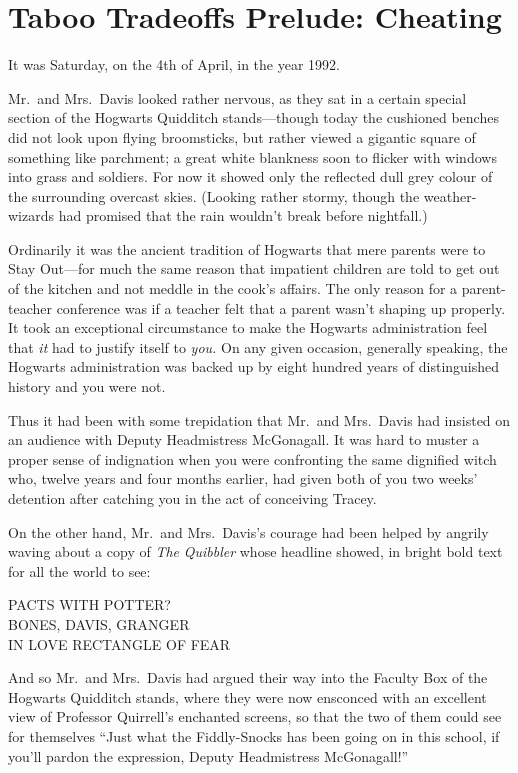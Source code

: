 \chapter{Taboo Tradeoffs Prelude:
Cheating}\label{taboo-tradeoffs-prelude-cheating}

It was Saturday, on the 4th of April, in the year 1992.

Mr.~and Mrs.~Davis looked rather nervous, as they sat in a certain
special section of the Hogwarts Quidditch stands---though today the
cushioned benches did not look upon flying broomsticks, but rather
viewed a gigantic square of something like parchment; a great white
blankness soon to flicker with windows into grass and soldiers. For now
it showed only the reflected dull grey colour of the surrounding
overcast skies. (Looking rather stormy, though the weather-wizards had
promised that the rain wouldn't break before nightfall.)

Ordinarily it was the ancient tradition of Hogwarts that mere parents
were to Stay Out---for much the same reason that impatient children are
told to get out of the kitchen and not meddle in the cook's affairs. The
only reason for a parent-teacher conference was if a teacher felt that a
parent wasn't shaping up properly. It took an exceptional circumstance
to make the Hogwarts administration feel that \emph{it} had to justify
itself to \emph{you.} On any given occasion, generally speaking, the
Hogwarts administration was backed up by eight hundred years of
distinguished history and you were not.

Thus it had been with some trepidation that Mr.~and Mrs.~Davis had
insisted on an audience with Deputy Headmistress McGonagall. It was hard
to muster a proper sense of indignation when you were confronting the
same dignified witch who, twelve years and four months earlier, had
given both of you two weeks' detention after catching you in the act of
conceiving Tracey.

On the other hand, Mr.~and Mrs.~Davis's courage had been helped by
angrily waving about a copy of \emph{The} \emph{Quibbler} whose headline
showed, in bright bold text for all the world to see:

PACTS WITH POTTER?\\BONES, DAVIS, GRANGER\\IN LOVE RECTANGLE OF FEAR

And so Mr.~and Mrs.~Davis had argued their way into the Faculty Box of
the Hogwarts Quidditch stands, where they were now ensconced with an
excellent view of Professor Quirrell's enchanted screens, so that the
two of them could see for themselves ``Just what the Fiddly-Snocks has
been going on in this school, if you'll pardon the expression, Deputy
Headmistress McGonagall!''

